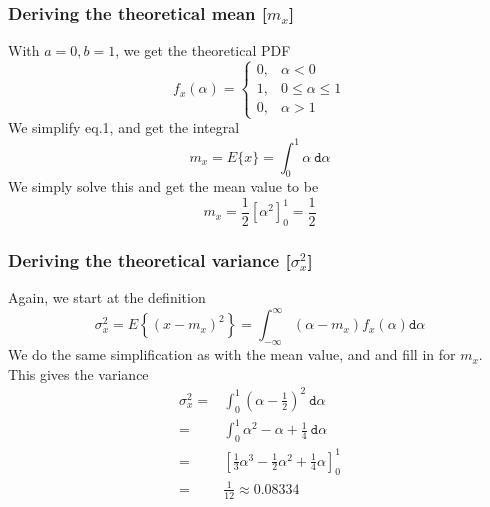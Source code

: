 \documentclass[compress]{beamer}
\begin{document}
\begin{frame}
    \frametitle{Deriving the theoretical mean [$m_x$]}
    With $a = 0, b = 1$, we get the theoretical PDF
    \begin{equation*}
        f_x(\alpha) = 
        \begin{cases}
            0, & \alpha < 0 \\
            1, & 0 \le \alpha \le 1 \\
            0, & \alpha > 1 
        \end{cases}
    \end{equation*}
    \pause
    We simplify eq.1, and get the integral
    \begin{equation*}
        m_x = E\{x\} = \int_0^1\alpha \ \texttt{d}\alpha
    \end{equation*}
    \pause
    We simply solve this and get the mean value to be
    \begin{equation*}
        m_x = \frac{1}{2} \left[\alpha^2\right]_0^1=\frac{1}{2}
    \end{equation*}
\end{frame}
\begin{frame}
    \frametitle{Deriving the theoretical variance [$\sigma_x^2$]}
    \pause
    Again, we start at the definition
    \begin{equation}
        \sigma_x^2=E\left\{(x-m_x)^2\right\}=\int_{-\infty}^{\infty}
        (\alpha - m_x) f_x( \alpha ) \texttt{d}\alpha
    \end{equation}
    \pause
    We do the same simplification as with the mean value, and and fill in for $m_x$.
    This gives the variance
    \begin{align*}
        \sigma_x^2=& \int_0^1\left(\alpha-\frac{1}{2}\right)^2\ \texttt{d}\alpha \\
        =& \int_0^1 \alpha^2-\alpha+\frac{1}{4}\ \texttt{d} \alpha \\
        =& \left[\frac{1}{3}\alpha^3-\frac{1}{2}\alpha^2+\frac{1}{4}\alpha\right]^1_0 \\
        =& \frac{1}{12} \approx 0.08334
    \end{align*}
\end{frame}
\end{document}
